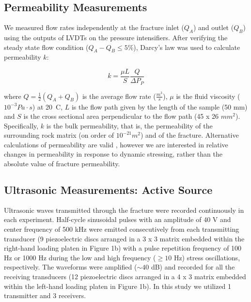 \documentclass[draft]{agujournal2019}
\begin{document}
\subsection{Permeability Measurements}
We measured flow rates independently at the fracture inlet ($Q_A$) and outlet ($Q_B$) using the outputs of LVDTs on the pressure intensifiers. After verifying the steady state flow condition ($Q_{A} - Q_{B}  \leq 5 \% $), Darcy’s law was used to calculate permeability $k$:
\begin{linenomath*}
\begin{equation} \label{eq:perm}
	k = \frac{\mu L}{S} \frac{Q}{\Delta P_P}
\end{equation}
\end{linenomath*}
where $Q = \frac{1}{2} (Q_A + Q_B )$ is the average flow rate ($\frac{m^3}{s}$), $\mu$ is the fluid viscosity ($10^{-3} Pa \cdot s$) at 20\degree\ C, $L$ is the flow path given by the length of the sample (50 mm) and $S$ is the cross sectional area perpendicular to the flow path (45 x 26 $mm^2$).
Specifically, $k$ is the bulk permeability, that is, the permeability of the surrounding rock matrix (on order of $10^{-21} m^2$) and of the fracture. Alternative calculations of permeability are valid \cite{Zhang17, Ishibashi18}, however we are interested in relative changes in permeability in response to dynamic stressing, rather than the absolute value of fracture permeability.

\subsection{Ultrasonic Measurements: Active Source}
Ultrasonic waves transmitted through the fracture were recorded continuously in each experiment. Half-cycle sinusoidal pulses with an amplitude of 40 V and center frequency of 500 kHz were emitted consecutively from each transmitting transducer (9 piezoelectric discs arranged in a 3 x 3 matrix embedded within the right-hand loading platen in Figure 1b) with a pulse repetition frequency of 100 Hz or 1000 Hz during the low and high frequency ($\geq 10$ Hz) stress oscillations, respectively. The waveforms were amplified ($\sim 40$ dB) and recorded for all the receiving transducers (12 piezoelectric discs arranged in a 4 x 3 matrix embedded within the left-hand loading platen in Figure 1b). In this study we utilized 1 transmitter and 3 receivers. 
\end{document}
